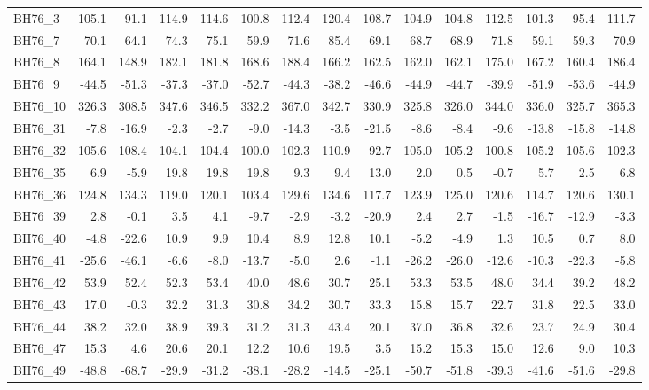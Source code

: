 \begin{longtable}{lrrrrrrrrrrrrrr}
BH76\_3 & 105.1 & 91.1 & 114.9 & 114.6 & 100.8 & 112.4 & 120.4 & 108.7 & 104.9 & 104.8 & 112.5 & 101.3 & 95.4 & 111.7 \\
BH76\_7 & 70.1 & 64.1 & 74.3 & 75.1 & 59.9 & 71.6 & 85.4 & 69.1 & 68.7 & 68.9 & 71.8 & 59.1 & 59.3 & 70.9 \\
BH76\_8 & 164.1 & 148.9 & 182.1 & 181.8 & 168.6 & 188.4 & 166.2 & 162.5 & 162.0 & 162.1 & 175.0 & 167.2 & 160.4 & 186.4 \\
BH76\_9 & -44.5 & -51.3 & -37.3 & -37.0 & -52.7 & -44.3 & -38.2 & -46.6 & -44.9 & -44.7 & -39.9 & -51.9 & -53.6 & -44.9 \\
BH76\_10 & 326.3 & 308.5 & 347.6 & 346.5 & 332.2 & 367.0 & 342.7 & 330.9 & 325.8 & 326.0 & 344.0 & 336.0 & 325.7 & 365.3 \\
BH76\_31 & -7.8 & -16.9 & -2.3 & -2.7 & -9.0 & -14.3 & -3.5 & -21.5 & -8.6 & -8.4 & -9.6 & -13.8 & -15.8 & -14.8 \\
BH76\_32 & 105.6 & 108.4 & 104.1 & 104.4 & 100.0 & 102.3 & 110.9 & 92.7 & 105.0 & 105.2 & 100.8 & 105.2 & 105.6 & 102.3 \\
BH76\_35 & 6.9 & -5.9 & 19.8 & 19.8 & 19.8 & 9.3 & 9.4 & 13.0 & 2.0 & 0.5 & -0.7 & 5.7 & 2.5 & 6.8 \\
BH76\_36 & 124.8 & 134.3 & 119.0 & 120.1 & 103.4 & 129.6 & 134.6 & 117.7 & 123.9 & 125.0 & 120.6 & 114.7 & 120.6 & 130.1 \\
BH76\_39 & 2.8 & -0.1 & 3.5 & 4.1 & -9.7 & -2.9 & -3.2 & -20.9 & 2.4 & 2.7 & -1.5 & -16.7 & -12.9 & -3.3 \\
BH76\_40 & -4.8 & -22.6 & 10.9 & 9.9 & 10.4 & 8.9 & 12.8 & 10.1 & -5.2 & -4.9 & 1.3 & 10.5 & 0.7 & 8.0 \\
BH76\_41 & -25.6 & -46.1 & -6.6 & -8.0 & -13.7 & -5.0 & 2.6 & -1.1 & -26.2 & -26.0 & -12.6 & -10.3 & -22.3 & -5.8 \\
BH76\_42 & 53.9 & 52.4 & 52.3 & 53.4 & 40.0 & 48.6 & 30.7 & 25.1 & 53.3 & 53.5 & 48.0 & 34.4 & 39.2 & 48.2 \\
BH76\_43 & 17.0 & -0.3 & 32.2 & 31.3 & 30.8 & 34.2 & 30.7 & 33.3 & 15.8 & 15.7 & 22.7 & 31.8 & 22.5 & 33.0 \\
BH76\_44 & 38.2 & 32.0 & 38.9 & 39.3 & 31.2 & 31.3 & 43.4 & 20.1 & 37.0 & 36.8 & 32.6 & 23.7 & 24.9 & 30.4 \\
BH76\_47 & 15.3 & 4.6 & 20.6 & 20.1 & 12.2 & 10.6 & 19.5 & 3.5 & 15.2 & 15.3 & 15.0 & 12.6 & 9.0 & 10.3 \\
BH76\_49 & -48.8 & -68.7 & -29.9 & -31.2 & -38.1 & -28.2 & -14.5 & -25.1 & -50.7 & -51.8 & -39.3 & -41.6 & -51.6 & -29.8 \\

\end{longtable}
